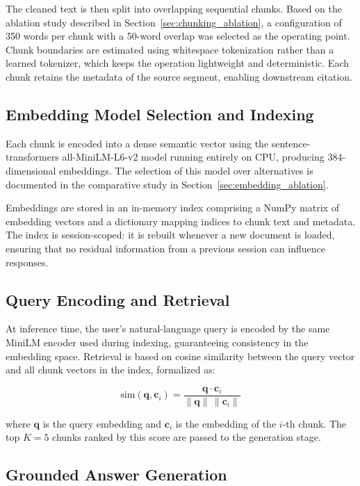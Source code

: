 \documentclass[conference]{IEEEtran}
\begin{document}
The cleaned text is then split into overlapping sequential chunks. Based on the ablation study described in Section~\ref{sec:chunking_ablation}, a configuration of 350 words per chunk with a 50-word overlap was selected as the operating point. Chunk boundaries are estimated using whitespace tokenization rather than a learned tokenizer, which keeps the operation lightweight and deterministic. Each chunk retains the metadata of the source segment, enabling downstream citation.

\subsection{Embedding Model Selection and Indexing}

Each chunk is encoded into a dense semantic vector using the sentence-transformers all-MiniLM-L6-v2 model running entirely on CPU, producing 384-dimensional embeddings. The selection of this model over alternatives is documented in the comparative study in Section~\ref{sec:embedding_ablation}.

Embeddings are stored in an in-memory index comprising a NumPy matrix of embedding vectors and a dictionary mapping indices to chunk text and metadata. The index is session-scoped: it is rebuilt whenever a new document is loaded, ensuring that no residual information from a previous session can influence responses.

\subsection{Query Encoding and Retrieval}

At inference time, the user's natural-language query is encoded by the same MiniLM encoder used during indexing, guaranteeing consistency in the embedding space. Retrieval is based on cosine similarity between the query vector and all chunk vectors in the index, formalized as:

\begin{equation}
\text{sim}(\mathbf{q}, \mathbf{c}_i) = \frac{\mathbf{q} \cdot \mathbf{c}_i}{\|\mathbf{q}\| \, \|\mathbf{c}_i\|}
\label{eq:cosine}
\end{equation}

where $\mathbf{q}$ is the query embedding and $\mathbf{c}_i$ is the embedding of the $i$-th chunk. The top $K = 5$ chunks ranked by this score are passed to the generation stage.

\subsection{Grounded Answer Generation}
\end{document}
